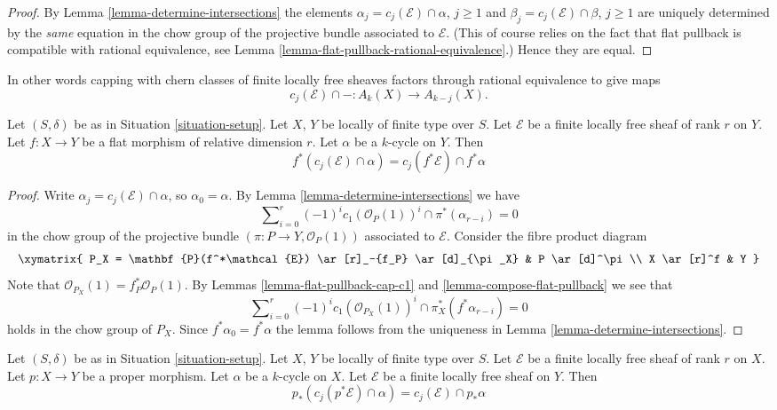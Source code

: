 \begin{proof}
By Lemma \ref{lemma-determine-intersections} the elements
$\alpha_j = c_j(\mathcal{E}) \cap \alpha$, $j \geq 1$ and
$\beta_j = c_j(\mathcal{E}) \cap \beta$, $j \geq 1$ are uniquely determined
by the {\it same} equation in the chow group of the projective
bundle associated to $\mathcal{E}$. (This of course relies on the fact that
flat pullback is compatible with rational equivalence, see
Lemma \ref{lemma-flat-pullback-rational-equivalence}.) Hence they are equal.
\end{proof}

\noindent
In other words capping with chern classes of
finite locally free sheaves factors through rational equivalence
to give maps
$$
c_j(\mathcal{E}) \cap - : A_k(X) \to A_{k - j}(X).
$$

\begin{lemma}
\label{lemma-flat-pullback-cap-cj}
Let $(S, \delta)$ be as in Situation \ref{situation-setup}.
Let $X$, $Y$ be locally of finite type over $S$.
Let $\mathcal{E}$ be a finite locally free sheaf of rank $r$ on $Y$.
Let $f : X \to Y$ be a flat morphism of relative dimension $r$.
Let $\alpha$ be a $k$-cycle on $Y$.
Then
$$
f^*(c_j(\mathcal{E}) \cap \alpha) = c_j(f^*\mathcal{E}) \cap f^*\alpha
$$
\end{lemma}

\begin{proof}
Write $\alpha_j = c_j(\mathcal{E}) \cap \alpha$, so $\alpha_0 = \alpha$.
By Lemma \ref{lemma-determine-intersections} we have
$$
\sum\nolimits_{i = 0}^r
(-1)^i c_1(\mathcal{O}_P(1))^i \cap
\pi^*(\alpha_{r - i}) = 0
$$
in the chow group of the projective bundle
$(\pi : P \to Y, \mathcal{O}_P(1))$
associated to $\mathcal{E}$. Consider the fibre product diagram
$$
\xymatrix{
P_X = \mathbf{P}(f^*\mathcal{E}) \ar[r]_-{f_P} \ar[d]_{\pi_X} &
P \ar[d]^\pi \\
X \ar[r]^f & Y
}
$$
Note that $\mathcal{O}_{P_X}(1) = f_P^*\mathcal{O}_P(1)$.
By Lemmas \ref{lemma-flat-pullback-cap-c1} and
\ref{lemma-compose-flat-pullback} we see that
$$
\sum\nolimits_{i = 0}^r
(-1)^i c_1(\mathcal{O}_{P_X}(1))^i \cap
\pi_X^*(f^*\alpha_{r - i}) = 0
$$
holds in the chow group of $P_X$. Since $f^*\alpha_0 = f^*\alpha$
the lemma follows from
the uniqueness in Lemma \ref{lemma-determine-intersections}.
\end{proof}

\begin{lemma}
\label{lemma-pushforward-cap-cj}
Let $(S, \delta)$ be as in Situation \ref{situation-setup}.
Let $X$, $Y$ be locally of finite type over $S$.
Let $\mathcal{E}$ be a finite locally free sheaf of rank $r$ on $X$.
Let $p : X \to Y$ be a proper morphism.
Let $\alpha$ be a $k$-cycle on $X$.
Let $\mathcal{E}$ be a finite locally free sheaf on $Y$.
Then
$$
p_*(c_j(p^*\mathcal{E}) \cap \alpha) = c_j(\mathcal{E}) \cap p_*\alpha
$$
\end{lemma}

